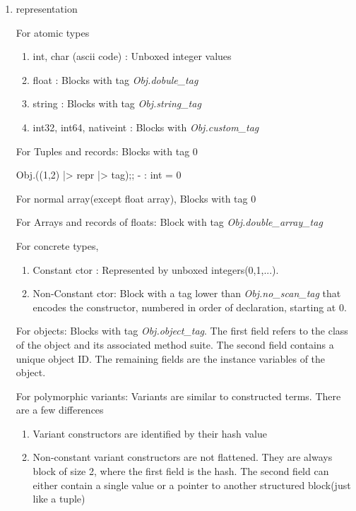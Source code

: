 \begin{enumerate}
\item representation

  For atomic types
  \begin{enumerate}
  \item int, char (ascii code) : Unboxed integer values
  \item float : Blocks with tag \textit{Obj.dobule\_tag}
  \item string : Blocks with tag \textit{Obj.string\_tag}
  \item int32, int64, nativeint : Blocks with \textit{Obj.custom\_tag}
  \end{enumerate}
  For Tuples and records: Blocks with tag 0
  \begin{alternate}
Obj.((1,2) |> repr |> tag);;
- : int = 0    
\end{alternate}
For normal array(except float array), Blocks with tag 0

For Arrays and records of floats: Block with tag
\textit{Obj.double\_array\_tag}

For concrete types, 
\begin{enumerate}
\item Constant ctor : Represented by unboxed integers(0,1,...).
\item Non-Constant ctor: Block with a tag lower than
  \textit{Obj.no\_scan\_tag} that encodes the constructor, numbered in
  order of declaration, starting at 0.
\end{enumerate}

For objects: Blocks with tag \textit{Obj.object\_tag}. The first field
refers to the class of the object and its associated method suite. The
second field contains a unique object ID. The remaining fields are the
instance variables of the object.

For polymorphic variants: Variants are similar to constructed
terms. There are a few differences
\begin{enumerate}
\item Variant constructors are identified by their hash value
\item Non-constant variant constructors are not flattened. They are
  always block of size 2, where the first field is the hash. The
  second field can either contain a single value or a pointer to
  another structured block(just like a tuple)
\end{enumerate}

\end{enumerate}


